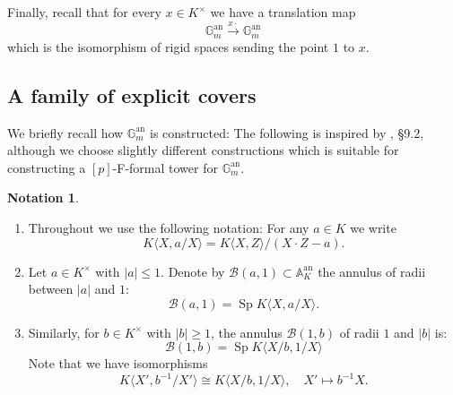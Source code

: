 \documentclass[10pt,oneside]{amsart}
\theoremstyle{definition}
\newtheorem{notation}[theorem]{Notation}
\begin{document}
	Finally, recall that for every $x\in K^\times$ we have a translation map
	\[\mathbb G_m^{\operatorname{an}}\xrightarrow{x\cdot} \mathbb G_m^{\operatorname{an}}\]
	which is the isomorphism of rigid spaces sending the point $1$ to $x$.
	
	\subsection{A family of explicit covers}
	We briefly recall how $\mathbb G_m^{\operatorname{an}}$ is constructed: The following is inspired by \cite{Bosch lectures}, \S 9.2, although we choose slightly different constructions which is suitable for constructing a $[p]$-F-formal tower for $\mathbb G_m^{\operatorname{an}}$. 
	
	\begin{notation} 
          \begin{enumerate}	
          \item Throughout we use the following notation: For any $a\in K$ we write
	\[K\langle X,a/X\rangle = K\langle X,Z\rangle/(X\cdot Z - a). \]
	  \item 	Let $a \in K^\times$ with $|a|\leq 1$. Denote by $\mathcal B(a,1) \subset \mathbb A_K^{\operatorname{an}}$ the  annulus of radii between $|a|$ and $1$:
	\[\mathcal B(a,1) = \operatorname{Sp} K\langle X,a/X\rangle. \]
	\item Similarly, for $b \in K^\times$ with $|b|\geq 1$, the annulus $\mathcal B(1,b)$ of radii $1$ and $|b|$ is: 
	\[\mathcal B(1,b) = \operatorname{Sp} K\langle X/b,1/X\rangle\]
Note that we have isomorphisms
	 \[K\langle X',b^{-1}/X'\rangle\cong K\langle X/b,1/X\rangle,\quad X'\mapsto b^{-1}X.\]	
	\end{enumerate}
	\end{notation}
	
\end{document}
